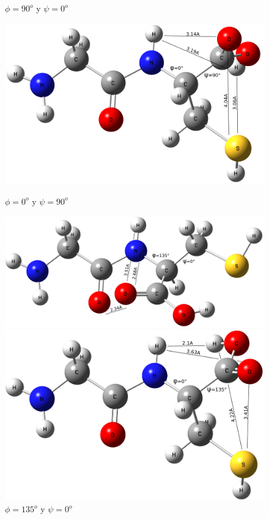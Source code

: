 \documentclass{article}
\begin{document}
\begin{figure}[h!]
\begin{minipage}[b]{0.49\textwidth}
          \caption{$\phi=90^o$ y $\psi=0^o$}
        \end{minipage}
        \hfill
        \begin{minipage}[b]{0.49\textwidth}
          \includegraphics[scale=0.085]{GlyCys3D90psi.png}
          \caption{$\phi=0^o$ y $\psi=90^o$}
        \end{minipage}
        \begin{minipage}[b]{0.49\textwidth}
            \centering
          \includegraphics[scale=0.085]{GlyCys3D9135fi.png}
          \caption{$\phi=135^o$ y $\psi=0^o$}
        \end{minipage}
        \hfill
        \begin{minipage}[b]{0.49\textwidth}
          \includegraphics[scale=0.085]{GlyCys3D135psi.png}

\end{minipage}
\end{figure}
\end{document}

